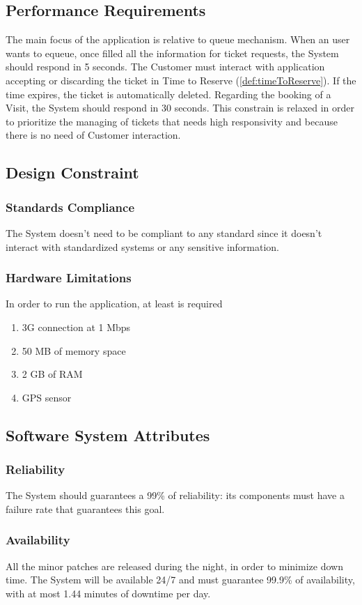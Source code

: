 \documentclass[a4paper, 12pt, oneside]{article}
\begin{document}
\subsection{Performance Requirements}
The main focus of the application is relative to queue mechanism.
When an user wants to equeue, once filled all the information for ticket requests, the System should respond in 5 seconds. The Customer must interact with application accepting or discarding the ticket in Time to Reserve  (\ref{def:timeToReserve}). If the time expires, the ticket is automatically deleted.
Regarding the booking of a Visit, the System should respond in 30 seconds. This constrain is relaxed in order to prioritize the managing of tickets that needs high responsivity and because there is no need of Customer interaction.

\subsection{Design Constraint}
\subsubsection{Standards Compliance}
The System doesn't need to be compliant to any standard since it doesn't interact with standardized systems or any sensitive information.
\subsubsection{Hardware Limitations}
In order to run the application, at least is required
\begin{enumerate}
    \item 3G connection at 1 Mbps
    \item 50 MB of memory space
    \item 2 GB of RAM
    \item GPS sensor
\end{enumerate}

\subsection{Software System Attributes}
\subsubsection{Reliability}
The System should guarantees a 99\% of reliability: its components must have
a failure rate that guarantees this goal. 
\subsubsection{Availability}
All the minor patches are released during the night, in order to minimize down time.
The System will be available 24/7 and must guarantee 99.9\% of availability, with at most 1.44 minutes of downtime per day.  
\end{document}
